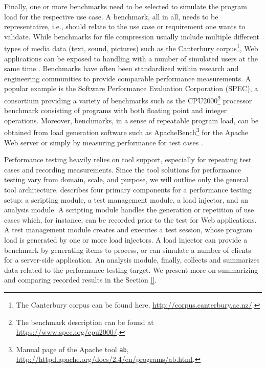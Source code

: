Finally, one or more benchmarks need to be selected to simulate  the program
load for the respective use case. A benchmark, all in all, needs to be
representative, i.e., should relate to the use case or requirement one
 wants to validate. While benchmarks for file compression usually include
multiple different types of media data (text, sound, pictures) such as the
Canterbury corpus\footnote{The Canterbury corpus can be found
here, \url{http://corpus.canterbury.ac.nz/}.}, Web applications can be exposed
to handling with a number of simulated users at the same time
\citep{molyneaux_art_2014}. Benchmarks have often been standardized within
research and engineering communities to provide comparable performance
measurements. A popular example is the Software Performance Evaluation
Corporation (SPEC), a consortium providing a variety of benchmarks such as the
CPU2000\footnote{The benchmark description can be found at \url{https://www.spec.org/cpu2000/}.} processor benchmark consisting of programs with both floating point and integer operations.
Moreover, benchmarks, in a sense of repeatable program load, can be obtained
from load generation software such as ApacheBench\footnote{Manual page of the
Apache tool \texttt{ab}, \url{http://httpd.apache.org/docs/2.4/en/programs/ab.html}.}
for the Apache Web server or simply by measuring performance for test cases
\citep{heger_automated_2013,nguyen_industrial_2014}.

Performance testing heavily relies on tool support, especially for repeating
test cases and recording measurements. Since the
tool solutions for performance testing vary from domain, scale, and purpose, we
will outline  only the general tool architecture. \cite{molyneaux_art_2014}
describes four primary components for a performance testing setup: a scripting module, a
test management module, a load injector, and an analysis module. A scripting module handles the generation or
repetition of use cases which, for instance, can be recorded prior to the test
for Web applications. A test management module creates and executes a test
session, whose program load is generated by one or more load injectors. A load
injector can provide a benchmark by generating items to process, or can simulate
a number of clients for a server-side application. An analysis module, finally,
collects and summarizes data related to the performance testing target. We present more on
summarizing and comparing recorded results in the Section \ref{}.


